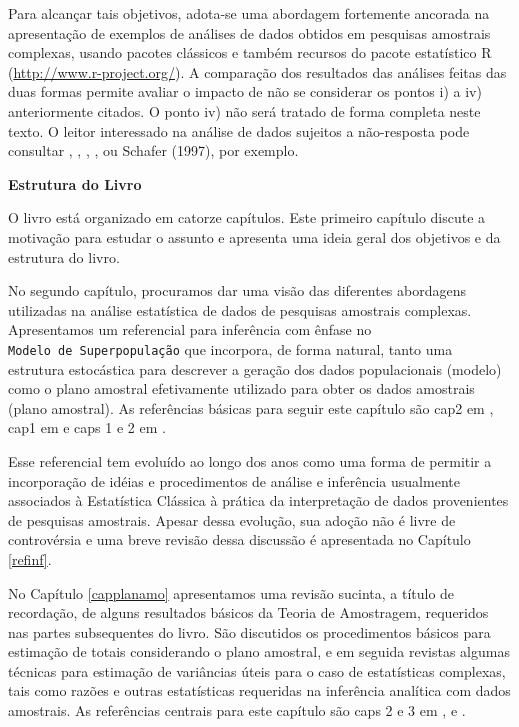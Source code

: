 \documentclass[]{book}
\numberwithin{example}{chapter}
\numberwithin{remark}{chapter}
\numberwithin{definition}{chapter}
\begin{document}
Para alcançar tais objetivos, adota-se uma abordagem fortemente ancorada
na apresentação de exemplos de análises de dados obtidos em pesquisas
amostrais complexas, usando pacotes clássicos e também recursos do
pacote estatístico R (\url{http://www.r-project.org/}). A comparação dos
resultados das análises feitas das duas formas permite avaliar o impacto
de não se considerar os pontos i) a iv) anteriormente citados. O ponto
iv) não será tratado de forma completa neste texto. O leitor interessado
na análise de dados sujeitos a não-resposta pode consultar
\citep{kalton83a}, \citep{LR2002}, \citep{Rubin87}, \citep{SSW92}, ou
Schafer (1997), por exemplo.

\textbf{Estrutura do Livro}

O livro está organizado em catorze capítulos. Este primeiro capítulo
discute a motivação para estudar o assunto e apresenta uma ideia geral
dos objetivos e da estrutura do livro.

No segundo capítulo, procuramos dar uma visão das diferentes abordagens
utilizadas na análise estatística de dados de pesquisas amostrais
complexas. Apresentamos um referencial para inferência com ênfase no
\texttt{Modelo\ de\ Superpopulação} que incorpora, de forma natural,
tanto uma estrutura estocástica para descrever a geração dos dados
populacionais (modelo) como o plano amostral efetivamente utilizado para
obter os dados amostrais (plano amostral). As referências básicas para
seguir este capítulo são cap2 em \citep{Silva}, cap1 em \citep{SHS89} e
caps 1 e 2 em \citep{CHSK2003}.

Esse referencial tem evoluído ao longo dos anos como uma forma de
permitir a incorporação de idéias e procedimentos de análise e
inferência usualmente associados à Estatística Clássica à prática da
interpretação de dados provenientes de pesquisas amostrais. Apesar dessa
evolução, sua adoção não é livre de controvérsia e uma breve revisão
dessa discussão é apresentada no Capítulo \ref{refinf}.

No Capítulo \ref{capplanamo} apresentamos uma revisão sucinta, a título
de recordação, de alguns resultados básicos da Teoria de Amostragem,
requeridos nas partes subsequentes do livro. São discutidos os
procedimentos básicos para estimação de totais considerando o plano
amostral, e em seguida revistas algumas técnicas para estimação de
variâncias úteis para o caso de estatísticas complexas, tais como razões
e outras estatísticas requeridas na inferência analítica com dados
amostrais. As referências centrais para este capítulo são caps 2 e 3 em
\citep{SSW92}, \citep{W85} e \citep{cochran}.
\end{document}
